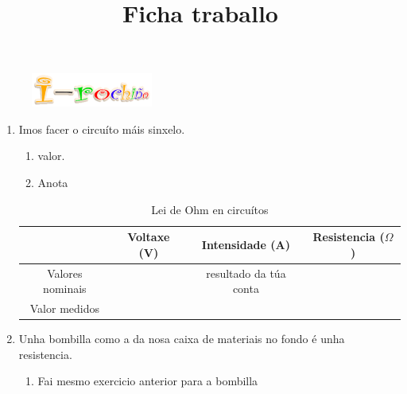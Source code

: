 \documentclass[11pt]{amsart}
\title{Ficha  traballo }
\begin{document}
\begin{figure}[ht]
	\raggedright
	\includegraphics[width=4cm]{i-rocho.png}
\end{figure}
 \maketitle

\thispagestyle{empty} 

\begin{enumerate}
 
\item Imos  facer o circuíto máis sinxelo.  
    \begin{enumerate}
        \item  valor.
        \item Anota     
    \end{enumerate}
  
      
     \begin{table}[htp]
    \begin{center}
     \caption{Lei de Ohm en circuítos}
        \begin{tabular}{| c | c | c | c |}
            \hline
             & Voltaxe (V) &  Intensidade (A) & Resistencia ($\Omega$) \\ \hline
            Valores nominais & &\tiny{resultado da túa conta} & \\ \hline
            Valor medidos & & &   \\ \hline
        \end{tabular}
    \end{center}
    \end{table}

  
\item 
	Unha bombilla como a da nosa caixa de materiais no fondo é unha resistencia.  
    	\begin{enumerate}
        		\item  Fai mesmo exercicio anterior para a bombilla
     	 \end{enumerate}
     
 
\end{enumerate}
%
%
\end{document}
